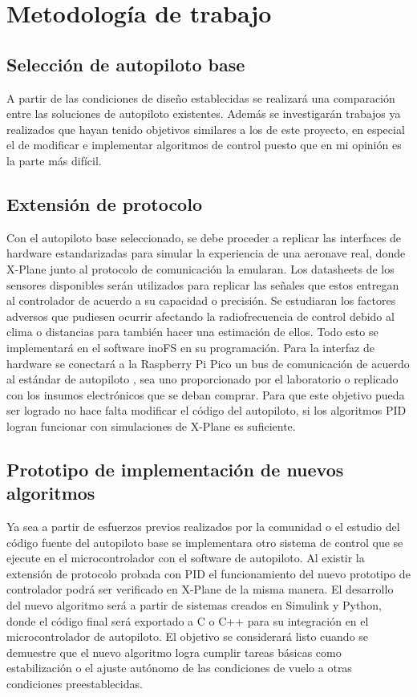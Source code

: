 \section{Metodología de trabajo}

\subsection{Selección de autopiloto base}

A partir de las condiciones de diseño establecidas se realizará una comparación entre las soluciones de autopiloto existentes. Además se investigarán trabajos ya realizados que hayan tenido objetivos similares a los de este proyecto, en especial el de modificar e implementar algoritmos de control puesto que en mi opinión es la parte más difícil.

\subsection{Extensión de protocolo}

Con el autopiloto base seleccionado, se debe proceder a replicar las interfaces de hardware estandarizadas para simular la experiencia de una aeronave real, donde X-Plane junto al protocolo de comunicación la emularan. Los datasheets de los sensores disponibles serán utilizados para replicar las señales que estos entregan al controlador de acuerdo a su capacidad o precisión. Se estudiaran los factores adversos que pudiesen ocurrir afectando la radiofrecuencia de control debido al clima o distancias para también hacer una estimación de ellos. Todo esto se implementará en el software inoFS \cite{inofs} en su programación. Para la interfaz de hardware se conectará a la Raspberry Pi Pico un bus de comunicación de acuerdo al estándar de autopiloto \cite{px4-bus}, sea uno proporcionado por el laboratorio o replicado con los insumos electrónicos que se deban comprar. Para que este objetivo pueda ser logrado no hace falta modificar el código del autopiloto, si los algoritmos PID logran funcionar con simulaciones de X-Plane es suficiente.

\subsection{Prototipo de implementación de nuevos algoritmos}

Ya sea a partir de esfuerzos previos realizados por la comunidad o el estudio del código fuente del autopiloto base se implementara otro sistema de control que se ejecute en el microcontrolador con el software de autopiloto. Al existir la extensión de protocolo probada con PID el funcionamiento del nuevo prototipo de controlador podrá ser verificado en X-Plane de la misma manera. El desarrollo del nuevo algoritmo será a partir de sistemas creados en Simulink y Python, donde el código final será exportado a C o C++ para su integración en el microcontrolador de autopiloto. El objetivo se considerará listo cuando se demuestre que el nuevo algoritmo logra cumplir tareas básicas como estabilización o el ajuste autónomo de las condiciones de vuelo a otras condiciones preestablecidas.

